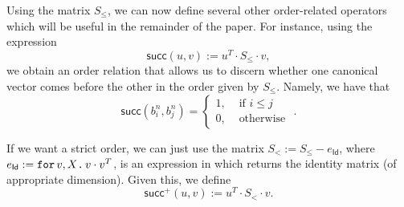 
%

Using the matrix $S_\leq$, we can now define several other order-related operators which will be useful in the remainder of the paper. For instance, using the expression 
$$
\mathsf{succ}(u,v) := u^T\cdot S_{\leq} \cdot v,
$$
we obtain an order relation that allows us to discern whether one canonical vector comes before 
the other in the order given by $S_{\leq}$. Namely, we have that $$\mathsf{succ}(b_i^n,b_j^n) = \begin{cases}
1, & \text{ if } i\leq j\\
0, & \text{ otherwise }
\end{cases}.$$


If we want a strict order, we can just use the matrix
$S_< := S_{\leq} - e_{\mathsf{Id}}$, where $e_{\mathsf{Id}} := \texttt{for}\, v,X \texttt{.}\, v\cdot v^T$, is an expression in \langfor which returns the identity matrix (of appropriate dimension). Given this, we define
$$\mathsf{succ}^+(u,v) := u^T\cdot S_{<} \cdot v.$$

